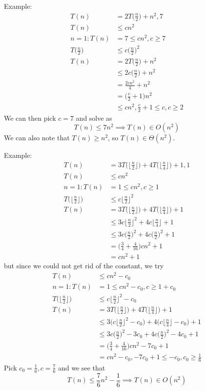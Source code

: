 \documentclass[12pt]{article}
\begin{document}
Example:
\begin{align*}
T(n) &= 2T\bigg(\frac{n}{2}\bigg) + n^2, 7 \\
T(n) &\leq cn^2 \\
n = 1: T(n) &= 7 \leq cn^2, c \geq 7 \\
T\bigg(\frac{n}{2}\bigg) &\leq c\bigg(\frac{n}{2}\bigg)^2 \\
T(n) &= 2T\bigg(\frac{n}{2}\bigg) + n^2 \\
     &\leq 2c\bigg(\frac{n}{2}\bigg) + n^2 \\
     &= \frac{2cn^2}{4} + n^2 \\
     &= \bigg(\frac{c}{2} + 1\bigg)n^2 \\
     &\leq cn^2, \frac{c}{2} + 1 \leq c, c \geq 2
\end{align*}
We can then pick $c = 7$ and solve as \[ T(n) \leq 7n^2 \implies T(n) \in O(n^2) \] We can also note that $T(n) \geq n^2$, so $T(n) \in \Theta(n^2)$.

Example:
\begin{align*}
T(n) &= 3T\bigg(\bigg\lfloor \frac{n}{2} \bigg\rfloor\bigg) + 4T\bigg(\bigg\lfloor \frac{n}{4} \bigg\rfloor\bigg) + 1, 1 \\
T(n) &\leq cn^2 \\
n = 1: T(n) &= 1 \leq cn^2, c \geq 1 \\
T\bigg(\bigg\lfloor \frac{n}{2} \bigg\rfloor\bigg) &\leq c\bigg\lfloor \frac{n}{2} \bigg\rfloor^2 \\
T(n) &= 3T\bigg(\bigg\lfloor \frac{n}{2} \bigg\rfloor\bigg) + 4T\bigg(\bigg\lfloor \frac{n}{4} \bigg\rfloor\bigg) + 1 \\
     &\leq 3c \bigg\lfloor \frac{n}{2} \bigg\rfloor^2 + 4c\bigg\lfloor \frac{n}{4} \bigg\rfloor + 1 \\
     &\leq 3c \bigg(\frac{n}{2}\bigg)^2 + 4c \bigg(\frac{n}{2}\bigg)^2 + 1 \\
     &= \bigg(\frac{3}{4} + \frac{4}{16}\bigg)cn^2 + 1 \\
     &= cn^2 + 1
\end{align*}
but since we could not get rid of the constant, we try
\begin{align*}
T(n) &\leq cn^2 - c_0 \\
n = 1: T(n) &= 1 \leq cn^2 - c_0, c \geq 1 + c_0 \\
T\bigg(\bigg\lfloor \frac{n}{2} \bigg\rfloor\bigg) &\leq c\bigg\lfloor \frac{n}{2} \bigg\rfloor^2 - c_0 \\
T(n) &= 3T\bigg(\bigg\lfloor \frac{n}{2} \bigg\rfloor\bigg) + 4T\bigg(\bigg\lfloor \frac{n}{4} \bigg\rfloor\bigg) + 1 \\
     &\leq 3\bigg(c \bigg\lfloor \frac{n}{2} \bigg\rfloor^2 - c_0\bigg) + 4\bigg(c\bigg\lfloor \frac{n}{4} \bigg\rfloor - c_0\bigg) + 1 \\
     &\leq 3c \bigg(\frac{n}{2}\bigg)^2 - 3c_0 + 4c \bigg(\frac{n}{2}\bigg)^2 - 4c_0 + 1 \\
     &= \bigg(\frac{3}{4} + \frac{4}{16}\bigg)cn^2 - 7c_0 + 1 \\
     &= cn^2 - c_0, -7c_0 + 1 \leq -c_0, c_0 \geq \frac{1}{6}
\end{align*}
Pick $c_0 = \frac{1}{6}, c = \frac{7}{6}$ and we see that \[ T(n) \leq \frac{7}{6}n^2 - \frac{1}{6} \implies T(n) \in O(n^2) \]
\end{document}
